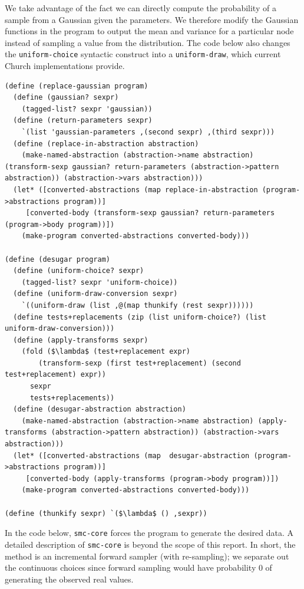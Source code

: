 \documentclass[a4paper,10pt]{article}
\begin{document}
We take advantage of the fact we can directly compute the probability of a sample from a Gaussian given the parameters.  We therefore modify the Gaussian functions in the program to output the mean and variance for a particular node instead of sampling a value from the distribution.  The code below also changes the \texttt{uniform-choice} syntactic construct into a \texttt{uniform-draw}, which current Church implementations provide.
\begin{lstlisting}[frame=trbl]
(define (replace-gaussian program)
  (define (gaussian? sexpr)
    (tagged-list? sexpr 'gaussian))
  (define (return-parameters sexpr)
    `(list 'gaussian-parameters ,(second sexpr) ,(third sexpr)))
  (define (replace-in-abstraction abstraction)
    (make-named-abstraction (abstraction->name abstraction) (transform-sexp gaussian? return-parameters (abstraction->pattern abstraction)) (abstraction->vars abstraction)))
  (let* ([converted-abstractions (map replace-in-abstraction (program->abstractions program))]
	 [converted-body (transform-sexp gaussian? return-parameters (program->body program))])
    (make-program converted-abstractions converted-body)))

(define (desugar program)
  (define (uniform-choice? sexpr)
    (tagged-list? sexpr 'uniform-choice))
  (define (uniform-draw-conversion sexpr)
    `((uniform-draw (list ,@(map thunkify (rest sexpr))))))
  (define tests+replacements (zip (list uniform-choice?) (list uniform-draw-conversion)))
  (define (apply-transforms sexpr)
    (fold ($\lambda$ (test+replacement expr)
	    (transform-sexp (first test+replacement) (second test+replacement) expr))
	  sexpr
	  tests+replacements))
  (define (desugar-abstraction abstraction)
    (make-named-abstraction (abstraction->name abstraction) (apply-transforms (abstraction->pattern abstraction)) (abstraction->vars abstraction)))
  (let* ([converted-abstractions (map  desugar-abstraction (program->abstractions program))]
	 [converted-body (apply-transforms (program->body program))])
    (make-program converted-abstractions converted-body)))

(define (thunkify sexpr) `($\lambda$ () ,sexpr))
\end{lstlisting}
In the code below, \texttt{smc-core} forces the program to generate the desired data.  A detailed description of \texttt{smc-core} is beyond the scope of this report. In short, the method is an incremental forward sampler (with re-sampling); we separate out the continuous choices since forward sampling would have probability $0$ of generating the observed real values.
\end{document}
